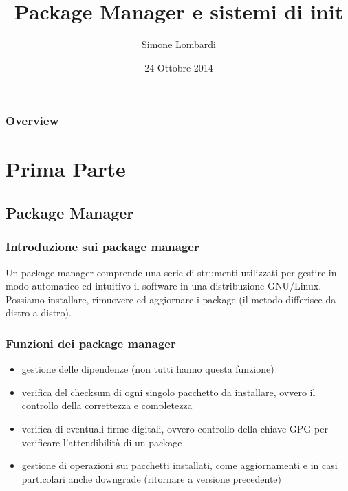 \documentclass{beamer}
\title[Linux Day 2014]{Package Manager e sistemi di init}
\author{Simone Lombardi}
\institute[HCSSLUG] 
{
Universit\`a degli studi di Salerno \\ 
\medskip
\textit{smlb@archlinux.info}  \\

http://smlb.me
}
\date{24 Ottobre 2014}
\begin{document}
\begin{frame}
\titlepage 
\end{frame}

\begin{frame}
\frametitle{Overview} 
\tableofcontents 
\end{frame}


\section{Prima Parte} 

\subsection{Package Manager} 

\begin{frame}
\frametitle{Introduzione sui package manager}
Un package manager comprende una serie di strumenti utilizzati per gestire in modo automatico ed intuitivo il software in una distribuzione GNU/Linux. Possiamo installare, rimuovere ed aggiornare i package (il metodo differisce da distro a distro). 
\end{frame}


\begin{frame}
	\frametitle{Funzioni dei package manager}
	\begin{itemize}
		\item gestione delle dipendenze (non tutti hanno questa funzione)
		\item verifica del checksum di ogni singolo pacchetto da installare, ovvero il controllo della correttezza e completezza
		\item verifica di eventuali firme digitali, ovvero controllo della chiave GPG per verificare l'attendibilit\`a di un package
		\item gestione di operazioni sui pacchetti installati, come aggiornamenti e in casi particolari anche downgrade (ritornare a versione precedente)
	\end{itemize}
\end{frame}
\end{document}
